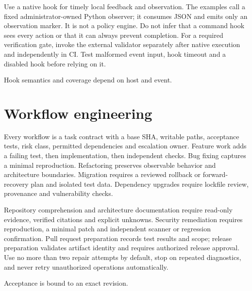 \documentclass[11pt,letterpaper]{article}
\begin{document}
Use a native hook for timely local feedback and observation. The examples call a fixed administrator-owned Python observer; it consumes JSON and emits only an observation marker. It is not a policy engine. Do not infer that a command hook sees every action or that it can always prevent completion. For a required verification gate, invoke the external validator separately after native execution and independently in CI. Test malformed event input, hook timeout and a disabled hook before relying on it.

\begin{center}\begin{minipage}{\linewidth}\captionsetup{type=figure}\centering{}\caption{Lifecycle hook execution}
\small Hook semantics and coverage depend on host and event.\end{minipage}\end{center}
\section{Workflow engineering}
Every workflow is a task contract with a base SHA, writable paths, acceptance tests, risk class, permitted dependencies and escalation owner. Feature work adds a failing test, then implementation, then independent checks. Bug fixing captures a minimal reproduction. Refactoring preserves observable behavior and architecture boundaries. Migration requires a reviewed rollback or forward-recovery plan and isolated test data. Dependency upgrades require lockfile review, provenance and vulnerability checks.

Repository comprehension and architecture documentation require read-only evidence, verified citations and explicit unknowns. Security remediation requires reproduction, a minimal patch and independent scanner or regression confirmation. Pull request preparation records test results and scope; release preparation validates artifact identity and requires authorized release approval. Use no more than two repair attempts by default, stop on repeated diagnostics, and never retry unauthorized operations automatically.

\begin{center}\begin{minipage}{\linewidth}\captionsetup{type=figure}\centering{}\caption{Agent-assisted engineering workflow}
\small Acceptance is bound to an exact revision.\end{minipage}\end{center}
\end{document}
